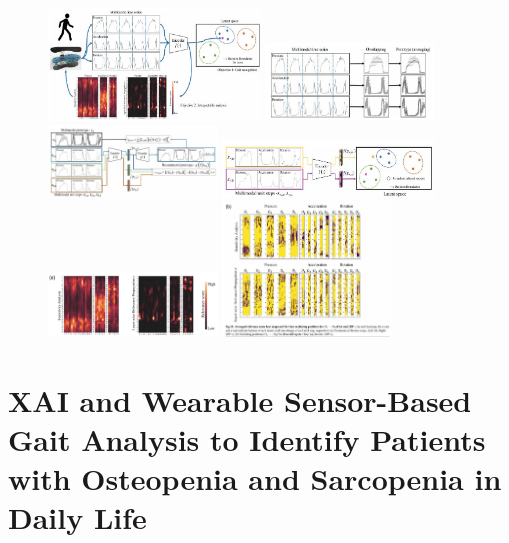\documentclass{report}
\begin{document}
\begin{figure}[H] 
    \centering
    \includegraphics[width=0.5\textwidth]{Images/Moon2022_1.jpg}
    \includegraphics[width=0.4\textwidth]{Images/Moon2022_2.jpg}
    \includegraphics[width=0.4\textwidth]{Images/Moon2022_3.jpg}
    \includegraphics[width=0.5\textwidth]{Images/Moon2022_4.jpg}
    \includegraphics[width=0.4\textwidth]{Images/Moon2022_5.jpg}
    \includegraphics[width=0.4\textwidth]{Images/Moon2022_6.jpg}
\end{figure}


\section{XAI and Wearable Sensor-Based Gait Analysis to Identify Patients with Osteopenia and Sarcopenia in Daily Life}
\end{document}
